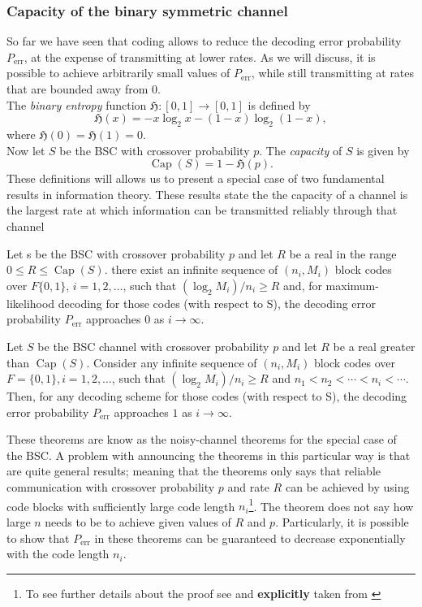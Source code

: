 \subsubsection{Capacity of the binary symmetric channel}
So far we have seen that coding allows to reduce the decoding error probability $P_{\text{err}}$, at the expense of transmitting at lower rates. As we will discuss, it is possible to achieve arbitrarily small values of $P_{\text{err}}$, while still transmitting at rates that are bounded away from $0$.\\
\indent The \textit{binary entropy} function $\mathfrak{H}:[0,1]\to[0,1]$ is defined by
\begin{equation}
\mathfrak{H}(x) = -x\log_2 x-(1-x)\log_2 (1-x),
\label{CH2:Binary entropy}
\end{equation}
where $\mathfrak{H}(0)=\mathfrak{H}(1)=0$.\\
\indent Now let $S$ be the BSC with crossover probability $p$. The \textit{capacity} of $S$ is given by
\begin{equation}
\operatorname{Cap}(S) = 1-\mathfrak{H}(p).
\end{equation}
These definitions will allows us to present a special case of two fundamental results in information theory. These results state the the capacity of a channel is the largest rate at which information can be transmitted reliably through that channel
\begin{theorem}
Let s be the BSC with crossover probability $p$ and let $R$ be a real in the range $0\leq R \leq \operatorname{Cap}(S)$. there exist an infinite sequence of $(n_i,M_i)$ block codes over $F\{0,1\}$, $i=1,2,\ldots$, such that $(\log_2 M_i)/n_i\geq R$ and, for maximum-likelihood decoding for those codes (with respect to S), the decoding error probability $P_{\text{err}}$ approaches $0$ as $i\to \infty$.
\end{theorem}
\begin{theorem} Let $S$ be the BSC channel with crossover probability $p$ and let $R$ be a real greater than $\operatorname{Cap}(S)$. Consider any infinite sequence of $(n_i,M_i)$ block codes over $F=\{0,1\}, i = 1,2,\ldots$, such that $(\log_2 M_i)/n_i\geq R$ and $n_1< n_2<\cdots< n_i < \cdots$. Then, for any decoding scheme for those codes (with respect to S), the decoding error probability $P_{\text{err}}$ approaches $1$ as $i\to \infty$.
\end{theorem}
These theorems are know as the noisy-channel theorems for the special case of the BSC. A problem with announcing the theorems in this particular way is that are quite general results; meaning that the theorems only says that reliable communication with crossover probability $p$ and rate $R$ can be achieved by using code blocks with sufficiently large code length $n_i$\footnote{To see further details about the proof see \cite{mackay_information_2003, roth_2006} and \textbf{explicitly} taken from \cite{roth_2006}}. The theorem does not say how large $n$ needs to be to achieve given values of $R$ and $p$. Particularly, it is possible to show that $P_{\text{err}}$ in these theorems can be guaranteed to decrease exponentially with the code length $n_i$.\\
